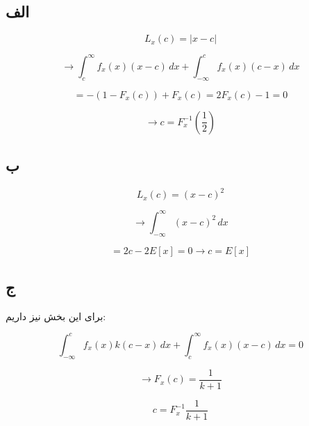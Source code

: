 \subsection*{الف}

$$
L_x (c) = |x - c|
$$

$$
\rightarrow \int_{c}^{\infty} f_x(x) (x - c) \, dx + \int_{- \infty}^{c} f_x(x) (c - x) \, dx
$$

$$
= - (1 - F_x(c)) + F_x(c) = 2 F_x(c) - 1 = 0
$$

$$
\rightarrow c = F^{-1}_x (\frac{1}{2})
$$

\subsection*{ب}

$$
L_x (c) = (x - c)^2
$$

$$
\rightarrow \int_{- \infty}^{\infty} (x - c)^2 \, dx
$$

$$
= 2c - 2E[x] = 0 \rightarrow c = E[x]
$$

\subsection*{ج}

برای این بخش نیز داریم:

$$
\int_{- \infty}^{c} f_x(x) k (c - x) \, dx + \int_{c}^{\infty} f_x(x)(x - c) \, dx = 0
$$

$$
\rightarrow F_x(c) = \frac{1}{k+1}
$$

$$
c = F^{-1}_x \frac{1}{k+1}
$$
